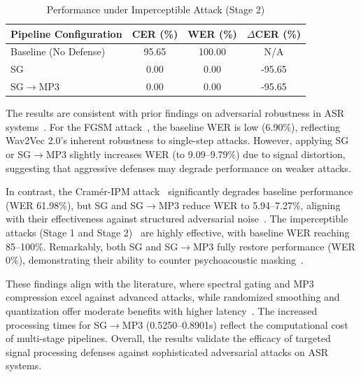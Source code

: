 \documentclass[../main.tex]{subfiles}
\begin{document}
\begin{table}[H]
\centering
\caption{Performance under Imperceptible Attack (Stage 2)}
\label{tab:imp_s2}
\begin{tabular}{lccc}
\toprule
Pipeline Configuration & CER (\%) & WER (\%) & $\Delta$CER (\%) \\
\midrule
Baseline (No Defense) & 95.65 & 100.00 & N/A \\
SG & 0.00 & 0.00 & -95.65 \\
SG$\to$MP3 & 0.00 & 0.00 & -95.65 \\
\bottomrule
\end{tabular}
\end{table}

The results are consistent with prior findings on adversarial robustness in ASR systems~\cite{goodfellow2015explaining,esmaeilpour2021towards,qin2019imperceptible,oreilly2022voiceblock,andronic2020mp3}. For the FGSM attack~\cite{goodfellow2015explaining}, the baseline WER is low (6.90\%), reflecting Wav2Vec 2.0's inherent robustness to single-step attacks. However, applying SG or SG$\to$MP3 slightly increases WER (to 9.09--9.79\%) due to signal distortion, suggesting that aggressive defenses may degrade performance on weaker attacks.

In contrast, the Cramér-IPM attack~\cite{esmaeilpour2021towards} significantly degrades baseline performance (WER 61.98\%), but SG and SG$\to$MP3 reduce WER to 5.94--7.27\%, aligning with their effectiveness against structured adversarial noise~\cite{oreilly2022voiceblock,andronic2020mp3}. The imperceptible attacks (Stage 1 and Stage 2)~\cite{qin2019imperceptible} are highly effective, with baseline WER reaching 85--100\%. Remarkably, both SG and SG$\to$MP3 fully restore performance (WER 0\%), demonstrating their ability to counter psychoacoustic masking~\cite{oreilly2022voiceblock,andronic2020mp3}.

These findings align with the literature, where spectral gating and MP3 compression excel against advanced attacks, while randomized smoothing and quantization offer moderate benefits with higher latency~\cite{cohen2019certified,li2024adaptive,li2024investigating}. The increased processing times for SG$\to$MP3 (0.5250--0.8901s) reflect the computational cost of multi-stage pipelines. Overall, the results validate the efficacy of targeted signal processing defenses against sophisticated adversarial attacks on ASR systems.
\end{document}
